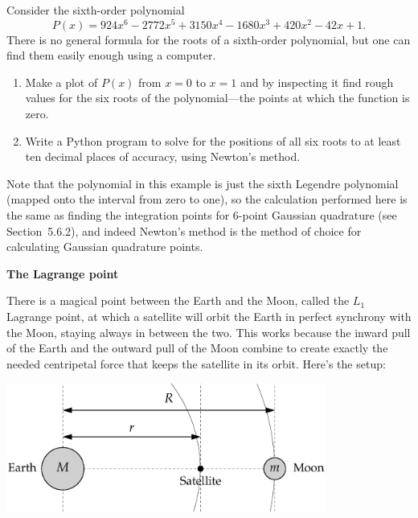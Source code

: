 \documentclass[12pt]{article}
\begin{document}
\begin{exercises}
\exskip Consider the sixth-order polynomial
\begin{displaymath}
P(x) = 924 x^6 - 2772 x^5 + 3150 x^4 - 1680 x^3 + 420 x^2 - 42 x + 1.
\end{displaymath}
There is no general formula for the roots of a sixth-order polynomial, but
one can find them easily enough using a computer.
\begin{enumerate}\setlength{\itemsep}{0pt}
\item Make a plot of $P(x)$ from $x=0$ to $x=1$ and by inspecting it find
  rough values for the six roots of the polynomial---the points at which
  the function is zero.
\item Write a Python program to solve for the positions of all six roots to
  at least ten decimal places of accuracy, using Newton's method.
\end{enumerate}
Note that the polynomial in this example is just the sixth Legendre
polynomial (mapped onto the interval from zero to one), so the calculation
performed here is the same as finding the integration points for 6-point
Gaussian quadrature (see Section~5.6.2), and indeed Newton's method is the
method of choice for calculating Gaussian quadrature points.



\exercise \textbf{The Lagrange point}

\exskip There is a magical point between the Earth and the Moon, called the
$L_1$ Lagrange point, at which a satellite will orbit the Earth in perfect
synchrony with the Moon, staying always in between the two.  This works
because the inward pull of the Earth and the outward pull of the Moon
combine to create exactly the needed centripetal force that keeps the
satellite in its orbit.  Here's the setup: \bigskip
\begin{center}
\includegraphics[width=10.5cm]{l1.eps}
\end{center}


\end{exercises}
\end{document}
